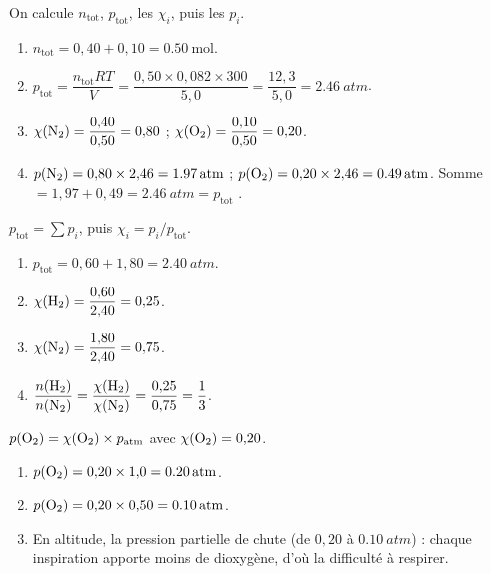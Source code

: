 \documentclass[11pt,a4paper]{article}
\begin{document}
\begin{corrige}
On calcule $n_{\text{tot}}$, $p_{\text{tot}}$, les $\chi_i$, puis les $p_i$.
\begin{enumerate}[label=\alph*)]
  \item $n_{\text{tot}}=0{,}40+0{,}10=\qty{0.50}{\mole}$.
  \item $p_{\text{tot}}=\dfrac{n_{\text{tot}}RT}{V}=\dfrac{0{,}50\times0{,}082\times300}{5{,}0}
        =\dfrac{12{,}3}{5{,}0}=\qty{2.46}{atm}$.
  \item $\chi(\ce{N2})=\dfrac{0{,}40}{0{,}50}=0{,}80$ ; $\chi(\ce{O2})=\dfrac{0{,}10}{0{,}50}=0{,}20$.
  \item $p(\ce{N2})=0{,}80\times2{,}46=\qty{1.97}{atm}$ ; $p(\ce{O2})=0{,}20\times2{,}46=\qty{0.49}{atm}$.
        Somme $=1{,}97+0{,}49=\qty{2.46}{atm}=p_{\text{tot}}$ \checkmark.
\end{enumerate}
\end{corrige}

\begin{corrige}
$p_{\text{tot}}=\sum p_i$, puis $\chi_i=p_i/p_{\text{tot}}$.
\begin{enumerate}[label=\alph*)]
  \item $p_{\text{tot}}=0{,}60+1{,}80=\qty{2.40}{atm}$.
  \item $\chi(\ce{H2})=\dfrac{0{,}60}{2{,}40}=0{,}25$.
  \item $\chi(\ce{N2})=\dfrac{1{,}80}{2{,}40}=0{,}75$.
  \item $\dfrac{n(\ce{H2})}{n(\ce{N2})}=\dfrac{\chi(\ce{H2})}{\chi(\ce{N2})}=\dfrac{0{,}25}{0{,}75}
        =\dfrac{1}{3}$.
\end{enumerate}
\end{corrige}

\begin{corrige}
$p(\ce{O2})=\chi(\ce{O2})\times p_{\text{atm}}$ avec $\chi(\ce{O2})=0{,}20$.
\begin{enumerate}[label=\alph*)]
  \item $p(\ce{O2})=0{,}20\times1{,}0=\qty{0.20}{atm}$.
  \item $p(\ce{O2})=0{,}20\times0{,}50=\qty{0.10}{atm}$.
  \item En altitude, la pression partielle de  chute (de $0{,}20$ à $\qty{0.10}{atm}$) : chaque
        inspiration apporte moins de dioxygène, d'où la difficulté à respirer.
\end{enumerate}
\end{corrige}
\end{document}
